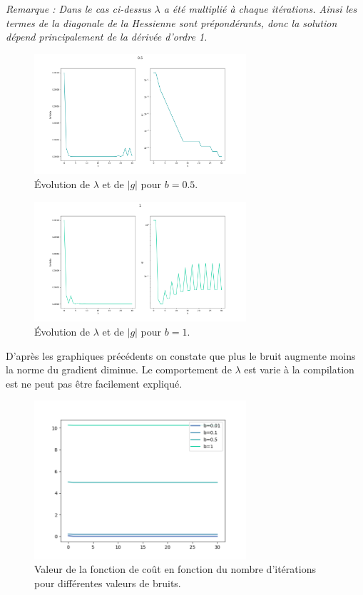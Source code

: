 \documentclass[12pt]{article}
\begin{document}
\textit{Remarque : Dans le cas ci-dessus $\lambda$ a été multiplié à chaque itérations. Ainsi  les termes de la diagonale de la Hessienne sont prépondérants, donc la solution dépend principalement de la dérivée d'ordre 1.  }



\begin{figure}[H]
\centering
\includegraphics[width=0.7\textwidth]{Q10_B05.png}
\caption{ Évolution de $\lambda$ et de $|g|$ pour $b=0.5$.}
\label{FigQ10B01}
\end{figure}


\begin{figure}[H]
\centering
\includegraphics[width=0.7\textwidth]{Q10_B1.png}
\caption{ Évolution de $\lambda$ et de $|g|$ pour $b=1$.}
\label{FigQ10B01}
\end{figure}

D'après les graphiques précédents on constate que plus le bruit augmente moins la norme du gradient diminue. Le comportement de $\lambda$ est varie à la compilation est ne peut pas être facilement expliqué.


\begin{figure}[H]
\centering
\includegraphics[width=0.7\textwidth]{Q10_F.png}
\caption{ Valeur de la fonction de coût en fonction du nombre d'itérations pour différentes valeurs de bruits.}
\label{FigQ10B01}
\end{figure}
\end{document}

